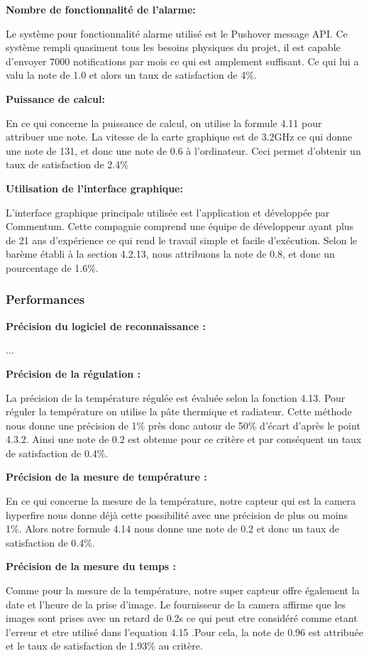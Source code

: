 \textbf{Nombre de fonctionnalité de l’alarme:}

Le système pour fonctionnalité alarme utilisé est le Pushover message API. Ce système rempli quasiment tous les besoins physiques du projet, il est capable d’envoyer 7000 notifications par mois ce qui est amplement suffisant. Ce qui lui a valu la note de 1.0 et alors un taux de satisfaction de 4\%.

\textbf{Puissance de calcul:}

En ce qui concerne la puissance de calcul, on utilise la formule 4.11 pour attribuer une note. La vitesse de la carte graphique est de 3.2GHz ce qui donne une note de 131, et donc une note de 0.6 à l’ordinateur. Ceci permet d’obtenir un taux de satisfaction de 2.4\%

\textbf{Utilisation de l’interface graphique:}

L’interface graphique principale utilisée est l’application et développée par Commentum. Cette compagnie comprend une équipe de développeur ayant plus de 21 ans d’expérience ce qui rend le travail simple et facile d’exécution. Selon le barème établi à la section 4.2.13, nous attribuons la note de 0.8, et donc un pourcentage de 1.6\%.

\subsubsection{Performances}

\textbf{Précision du logiciel de reconnaissance : }

...

\textbf{Précision de la régulation : }

La précision de la température régulée est évaluée selon la fonction 4.13. Pour réguler la température on utilise la pâte thermique et radiateur. Cette méthode nous donne une précision de 1\% près donc autour de 50\% d’écart d’après le point 4.3.2. Ainsi une note de 0.2 est obtenue pour ce critère et par conséquent un taux de satisfaction de 0.4\%.

\textbf{Précision de la mesure de température : }

En ce qui concerne la mesure de la température, notre capteur qui est la camera hyperfire nous donne déjà cette possibilité avec une précision de plus ou moins 1\%. Alors notre formule 4.14 nous donne une note de 0.2 et donc un taux de satisfaction de 0.4\%.

\textbf{Précision de la mesure du temps : }

Comme pour la mesure de la température, notre super capteur offre également la date et l’heure de la prise d’image. Le fournisseur de la camera affirme que les images sont prises avec un retard de 0.2s ce qui peut etre considéré comme etant l’erreur et etre utilisé dans l’equation 4.15 .Pour cela, la note de 0.96 est attribuée et le taux de satisfaction de 1.93\% au critère.


